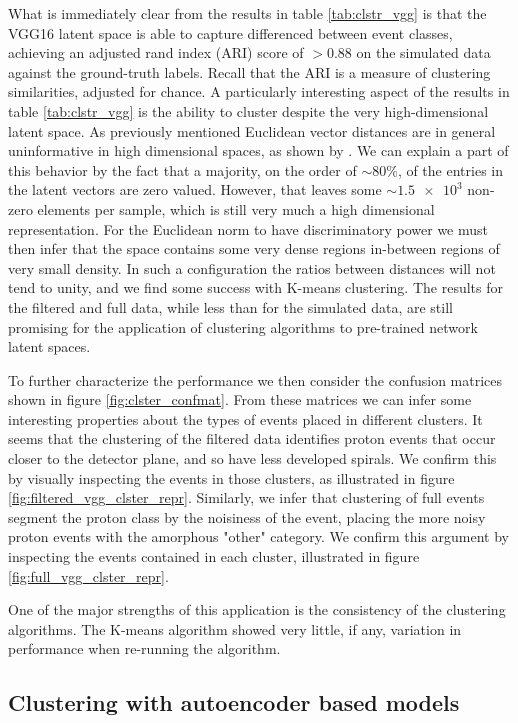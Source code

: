 What is immediately clear from the results in table \ref{tab:clstr_vgg} is that the VGG16 latent space is able to capture differenced between event classes, achieving an adjusted rand index (ARI) score of $>0.88$ on the simulated data against the ground-truth labels. Recall that the ARI is a measure of clustering similarities, adjusted for chance. A particularly interesting aspect of the results in  table \ref{tab:clstr_vgg} is the ability to cluster despite the very high-dimensional latent space. As previously mentioned Euclidean vector distances are in general uninformative	 in high dimensional spaces, as shown by \cite{Aggarwal}. We can explain a part of this behavior by the fact that a majority, on the order of $\sim 80\%$, of the entries in the latent vectors are zero valued. However, that leaves some $\sim \num{1.5e3}$ non-zero elements per sample, which is still very much a high dimensional representation. For the Euclidean norm to have discriminatory power we must then infer that the space contains some very dense regions in-between regions of very small density. In such a configuration the ratios between distances will not tend to unity, and we find some success with K-means clustering. The results for the filtered and full data, while less than for the simulated data, are still promising for the application of clustering algorithms to pre-trained network latent spaces.

To further characterize the performance we then consider the confusion matrices shown in figure \ref{fig:clster_confmat}. From these matrices we can infer some interesting properties about the types of events placed in different clusters. It seems that the clustering of the filtered data identifies proton events that occur closer to the detector plane, and so have less developed spirals. We confirm this by visually inspecting the events in those clusters, as illustrated in figure \ref{fig:filtered_vgg_clster_repr}. Similarly, we infer that clustering of full events segment the proton class by the noisiness of the event, placing the more noisy proton events with the amorphous "other" category. We confirm this argument by inspecting the events contained in each cluster, illustrated in figure \ref{fig:full_vgg_clster_repr}.

One of the major strengths of this application is the consistency of the clustering algorithms. The K-means algorithm showed very little, if any, variation in performance when re-running the algorithm. 

\subsection{Clustering with autoencoder based models}

